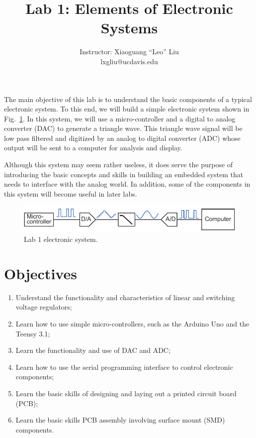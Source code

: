 \documentclass[letterpaper, 11pt]{article}
\begin{document}
\title{Lab 1: Elements of Electronic Systems}
\author{Instructor: Xiaoguang ``Leo'' Liu\\lxgliu@ucdavis.edu}
\date{}

\maketitle

The main objective of this lab is to understand the basic components of a typical electronic system. To this end, we will build a simple electronic system shown in Fig.~\ref{fig:lab1-system}. In this system, we will use a micro-controller and a digital to analog converter (DAC) to generate a triangle wave. This triangle wave signal will be low pass filtered and digitized by an analog to digital converter (ADC) whose output will be sent to a computer for analysis and display.

Although this system may seem rather useless, it does serve the purpose of introducing the basic concepts and skills in building an embedded system that needs to interface with the analog world. In addition, some of the components in this system will become useful in later labs. 

\begin{figure}[h]
	\centering
	\includegraphics{lab1-system}
	\caption{Lab 1 electronic system.}
	\label{fig:lab1-system}
\end{figure}

\section{Objectives}

\begin{enumerate}[itemsep=0.1ex]
	\item Understand the functionality and characteristics of linear and switching voltage regulators;
	\item Learn how to use simple micro-controllers, such as the Arduino Uno and the Teensy 3.1;
	\item Learn the functionality and use of DAC and ADC;
	\item Learn how to use the serial programming interface to control electronic components;
	\item Learn the basic skills of designing and laying out a printed circuit board (PCB);
	\item Learn the basic skills PCB assembly involving surface mount (SMD) components.
\end{enumerate}
\end{document}
